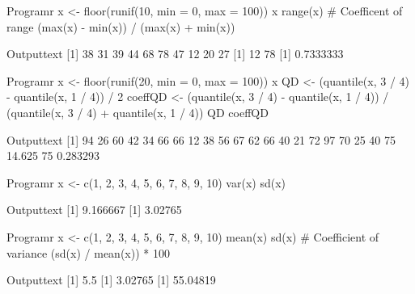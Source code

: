 
\begin{code}
    {Program}{r}
x <- floor(runif(10, min = 0, max = 100))
x
range(x)
# Coefficent of range
(max(x) - min(x)) / (max(x) + min(x))
\end{code}
\begin{code}
    {Output}{text}
 [1] 38 31 39 44 68 78 47 12 20 27
[1] 12 78
[1] 0.7333333
\end{code}

\begin{code}
    {Program}{r}
x <- floor(runif(20, min = 0, max = 100))
x
QD <- (quantile(x, 3 / 4) - quantile(x, 1 / 4)) / 2
coeffQD <- (quantile(x, 3 / 4) - quantile(x, 1 / 4)) / (quantile(x, 3 / 4) + quantile(x, 1 / 4))
QD
coeffQD
\end{code}
\begin{code}
    {Output}{text}
 [1] 94 26 60 42 34 66 66 12 38 56 67 62 66 40 21 72 97 70 25 40
   75%
14.625
     75%
0.283293
\end{code}

\begin{code}
    {Program}{r}
x <- c(1, 2, 3, 4, 5, 6, 7, 8, 9, 10)
var(x)
sd(x)
\end{code}
\begin{code}
    {Output}{text}
[1] 9.166667
[1] 3.02765
\end{code}
\newpage
\pagestyle{fancy}

\begin{code}
    {Program}{r}
x <- c(1, 2, 3, 4, 5, 6, 7, 8, 9, 10)
mean(x)
sd(x)
# Coefficient of variance
(sd(x) / mean(x)) * 100
\end{code}
\begin{code}
    {Output}{text}
[1] 5.5
[1] 3.02765
[1] 55.04819
\end{code}

